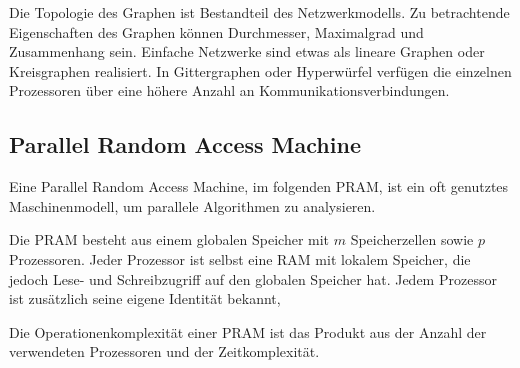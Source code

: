 Die Topologie des Graphen ist Bestandteil des Netzwerkmodells.
Zu betrachtende Eigenschaften des Graphen können Durchmesser, Maximalgrad und Zusammenhang sein.
Einfache Netzwerke sind etwas als lineare Graphen oder Kreisgraphen realisiert.
In Gittergraphen oder Hyperwürfel verfügen die einzelnen Prozessoren über eine höhere Anzahl an Kommunikationsverbindungen.
\cite[S.16f.]{jaja}


\subsection{Parallel Random Access Machine}
Eine Parallel Random Access Machine, im folgenden PRAM, ist ein oft genutztes Maschinenmodell, um parallele Algorithmen zu analysieren.

Die PRAM besteht aus einem globalen Speicher mit $m$ Speicherzellen sowie $p$ Prozessoren.
Jeder Prozessor ist selbst eine RAM mit lokalem Speicher, die jedoch Lese- und Schreibzugriff auf den globalen Speicher hat.
Jedem Prozessor ist zusätzlich seine eigene Identität bekannt,

Die Operationenkomplexität einer PRAM ist das Produkt aus der Anzahl der verwendeten Prozessoren und der Zeitkomplexität.



